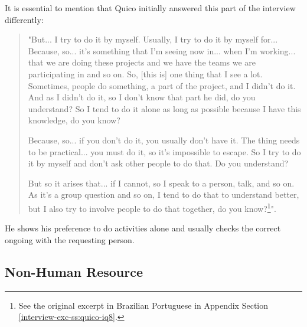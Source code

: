 It is essential to mention that Quico initially answered this part of the interview differently:
\begin{quote}
    "But... I try to do it by myself. Usually, I try to do it by myself for... Because, so... it's something that I'm seeing now in... when I'm working... that we are doing these projects and we have the teams we are participating in and so on. So, [this is] one thing that I see a lot. Sometimes, people do something, a part of the project, and I didn't do it. And as I didn't do it, so I don't know that part he did, do you understand? So I tend to do it alone as long as possible because I have this knowledge, do you know?

    Because, so... if you don't do it, you usually don't have it. The thing needs to be practical... you must do it, so it's impossible to escape. So I try to do it by myself and don't ask other people to do that. Do you understand?

    But so it arises that... if I cannot, so I speak to a person, talk, and so on. As it's a group question and so on, I tend to do that to understand better, but I also try to involve people to do that together, do you know?\footnote{See the original excerpt in Brazilian Portuguese in Appendix Section \ref{interview-exc-ss:quico-iq8}.}".    
\end{quote}
He shows his preference to do activities alone and usually checks the correct ongoing with the requesting person.

\subsection{Non-Human Resource}
\label{results-ss:non-human}

